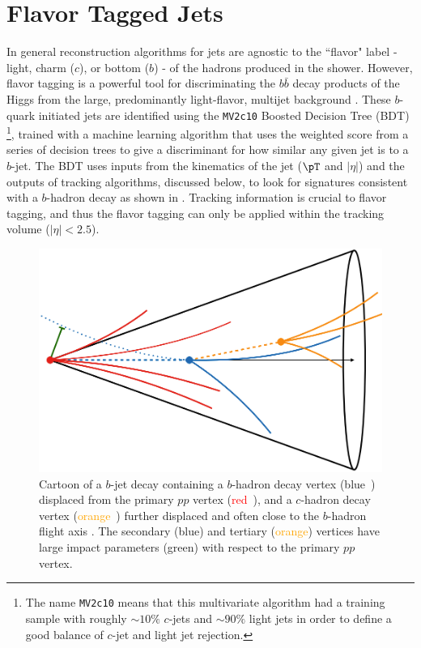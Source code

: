 \section{Flavor Tagged Jets} \label{sec:objects:flavor_tagging}

In general reconstruction algorithms for jets are agnostic to the ``flavor"
label - light, charm ($c$), or bottom ($b$) - of the hadrons produced in
the shower.  However, flavor tagging is a powerful tool for discriminating the
$b\bar{b}$ decay products of the Higgs from the large, predominantly
light-flavor, multijet background \cite{Aad:2015ydr}.  These $b$-quark
initiated jets are identified using the \texttt{MV2c10}
\cite{ATL-PHYS-PUB-2015-022} Boosted Decision Tree (BDT) \footnote{The name
\texttt{MV2c10} means that this multivariate algorithm had a training sample
with roughly $\sim10\%$ $c$-jets and $\sim90\%$ light jets in order to define a
good balance of $c$-jet and light jet rejection.}, trained with a machine learning
algorithm that uses the weighted score from a series of decision trees to give
a discriminant for how similar any given jet is to a $b$-jet.  The BDT uses
inputs from the kinematics of the jet ($\pT$ and $|\eta|$) and the
outputs of tracking algorithms, discussed below, to look for signatures
consistent with a $b$-hadron decay as shown in .
Tracking information is crucial to flavor tagging, and thus the flavor tagging can only be applied
within the tracking volume ($|\eta| < 2.5$).

\begin{figure}[!htbp]
  \centering
  \includegraphics[width=0.8\linewidth]{figures/objects/b_decay}
  \caption{Cartoon of a $b$-jet decay containing a $b$-hadron decay vertex
(\textcolor{track_blue}{blue}~\protect{}) displaced from the
primary $pp$ vertex (\textcolor{red}{red}~\protect{}), and a
$c$-hadron decay vertex (\textcolor{orange}{orange}~\protect{})
further displaced and often close to the $b$-hadron flight axis
\cite{Chisholm:bjet}. The secondary (\textcolor{track_blue}{blue}) and tertiary
(\textcolor{orange}{orange}) vertices have large impact parameters
(\textcolor{IPgreen}{green}) with respect to the primary $pp$ vertex.}
  \label{sec:objects:b_decay}
\end{figure}

